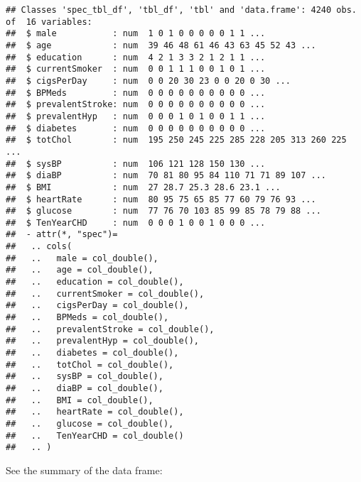 \documentclass[]{article}
\begin{document}
\begin{verbatim}
## Classes 'spec_tbl_df', 'tbl_df', 'tbl' and 'data.frame': 4240 obs. of  16 variables:
##  $ male           : num  1 0 1 0 0 0 0 0 1 1 ...
##  $ age            : num  39 46 48 61 46 43 63 45 52 43 ...
##  $ education      : num  4 2 1 3 3 2 1 2 1 1 ...
##  $ currentSmoker  : num  0 0 1 1 1 0 0 1 0 1 ...
##  $ cigsPerDay     : num  0 0 20 30 23 0 0 20 0 30 ...
##  $ BPMeds         : num  0 0 0 0 0 0 0 0 0 0 ...
##  $ prevalentStroke: num  0 0 0 0 0 0 0 0 0 0 ...
##  $ prevalentHyp   : num  0 0 0 1 0 1 0 0 1 1 ...
##  $ diabetes       : num  0 0 0 0 0 0 0 0 0 0 ...
##  $ totChol        : num  195 250 245 225 285 228 205 313 260 225 ...
##  $ sysBP          : num  106 121 128 150 130 ...
##  $ diaBP          : num  70 81 80 95 84 110 71 71 89 107 ...
##  $ BMI            : num  27 28.7 25.3 28.6 23.1 ...
##  $ heartRate      : num  80 95 75 65 85 77 60 79 76 93 ...
##  $ glucose        : num  77 76 70 103 85 99 85 78 79 88 ...
##  $ TenYearCHD     : num  0 0 0 1 0 0 1 0 0 0 ...
##  - attr(*, "spec")=
##   .. cols(
##   ..   male = col_double(),
##   ..   age = col_double(),
##   ..   education = col_double(),
##   ..   currentSmoker = col_double(),
##   ..   cigsPerDay = col_double(),
##   ..   BPMeds = col_double(),
##   ..   prevalentStroke = col_double(),
##   ..   prevalentHyp = col_double(),
##   ..   diabetes = col_double(),
##   ..   totChol = col_double(),
##   ..   sysBP = col_double(),
##   ..   diaBP = col_double(),
##   ..   BMI = col_double(),
##   ..   heartRate = col_double(),
##   ..   glucose = col_double(),
##   ..   TenYearCHD = col_double()
##   .. )
\end{verbatim}

See the summary of the data frame:
\end{document}
